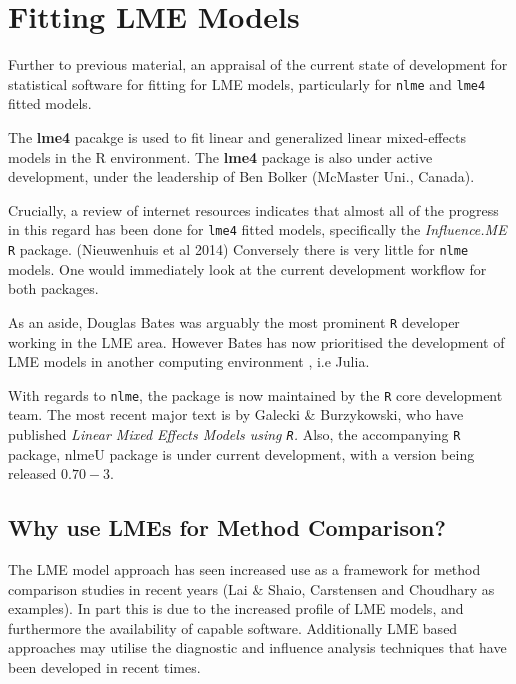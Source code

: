 \documentclass[12pt, a4paper]{report}
\theoremstyle{plain}
\theoremstyle{definition}
\theoremstyle{remark}
\begin{document}
	
	\chapter{Fitting LME Models}
	Further to previous material, an appraisal of the current state of development for statistical software for fitting for LME models, particularly for \texttt{nlme} and \texttt{lme4} fitted models.
	
	
	The \textbf{lme4} pacakge is used to fit linear and generalized linear mixed-effects models in the R environment.
	The \textbf{lme4} package is also under active development, under the leadership of Ben Bolker (McMaster Uni., Canada).
	
	
	Crucially, a review of internet resources indicates that almost all of the progress in this regard has been done for \texttt{lme4} fitted models, specifically the \textit{Influence.ME} \texttt{R} package. (Nieuwenhuis et al 2014)
	Conversely there is very little for \texttt{nlme} models. One would immediately look at the current development workflow for both packages.
	
	
	As an aside, Douglas Bates was arguably the most prominent \texttt{R} developer working in the LME area. 
	However Bates has now prioritised the development of LME models in another computing environment , i.e Julia. 
	
	
	With regards to \texttt{nlme}, the package is now maintained by the \texttt{R} core development team. The most recent major text is by Galecki \& Burzykowski, who have published \textit{ Linear Mixed Effects Models using \texttt{R}. }
	Also, the accompanying \texttt{R} package, nlmeU package is under current development, with a version being released $0.70-3$.
	
	
	


	\section{Why use LMEs for Method Comparison?}
	The LME model approach has seen increased use as a framework for method comparison studies in recent years (Lai $\&$ Shaio, Carstensen and Choudhary as examples). In part this is due to the increased profile of LME models, and furthermore the availability of capable software. Additionally LME based approaches may utilise the diagnostic and influence analysis techniques that have been developed in recent times.
	
\end{document}
